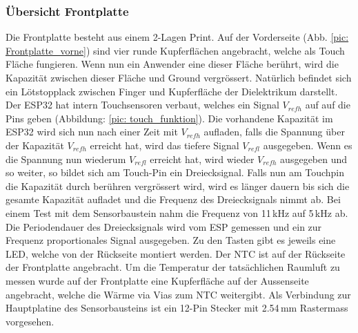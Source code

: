 \subsubsection{Übersicht Frontplatte}
Die Frontplatte besteht aus einem 2-Lagen Print. Auf der Vorderseite (Abb. \ref{pic: Frontplatte_vorne}) sind vier runde Kupferflächen angebracht, welche als Touch Fläche fungieren. Wenn nun ein Anwender eine dieser Fläche berührt, wird die Kapazität zwischen dieser Fläche und Ground vergrössert. Natürlich befindet sich ein Lötstopplack zwischen Finger und Kupferfläche der Dielektrikum darstellt. Der ESP32 hat intern Touchsensoren verbaut, welches ein Signal $V_{refh}$ auf auf die Pins geben (Abbildung: \ref{pic: touch_funktion}). Die vorhandene Kapazität im ESP32 wird sich nun nach einer Zeit mit $V_{refh}$ aufladen, falls die Spannung über der Kapazität $V_{refh}$ erreicht hat, wird das tiefere Signal $V_{refl}$ ausgegeben. Wenn es die Spannung nun wiederum $V_{refl}$ erreicht hat, wird wieder $V_{refh}$ ausgegeben und so weiter, so bildet sich am Touch-Pin ein Dreiecksignal. Falls nun am Touchpin die Kapazität durch berühren vergrössert wird, wird es länger dauern bis sich die gesamte Kapazität aufladet und die Frequenz des Dreiecksignals nimmt ab. Bei einem Test mit dem Sensorbaustein nahm die Frequenz von 11\,kHz auf 5\,kHz ab. Die Periodendauer des Dreiecksignals wird vom ESP gemessen und ein zur Frequenz proportionales Signal ausgegeben. Zu den Tasten gibt es jeweils eine LED, welche von der Rückseite montiert werden. Der NTC ist auf der Rückseite der Frontplatte angebracht. Um die Temperatur der tatsächlichen Raumluft zu messen wurde auf der Frontplatte eine Kupferfläche auf der Aussenseite angebracht, welche die Wärme via Vias zum NTC weitergibt. Als Verbindung zur Hauptplatine des Sensorbausteins ist ein 12-Pin Stecker mit 2.54\,mm Rastermass vorgesehen.


